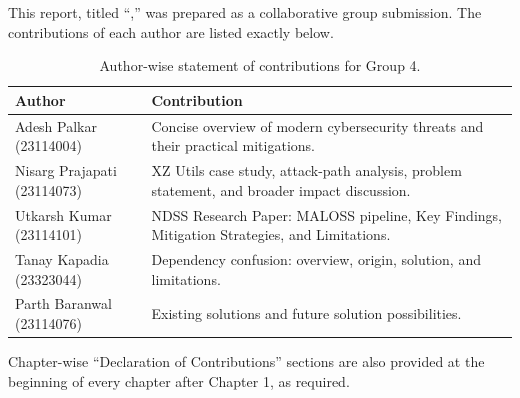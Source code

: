 This report, titled ``\ttitle,'' was prepared as a collaborative group submission.
The contributions of each author are listed exactly below.

\begin{table}[h]
\centering
\renewcommand{\arraystretch}{1.2}
\begin{tabular}{p{} p{}}
\toprule
\textbf{Author} & \textbf{Contribution} \\
\midrule
Adesh Palkar (23114004) & Concise overview of modern cybersecurity threats and their practical mitigations. \\
Nisarg Prajapati (23114073) & XZ Utils case study, attack-path analysis, problem statement, and broader impact discussion. \\
Utkarsh Kumar (23114101) & NDSS Research Paper: MALOSS pipeline, Key Findings, Mitigation Strategies, and Limitations. \\
Tanay Kapadia (23323044) & Dependency confusion: overview, origin, solution, and limitations. \\
Parth Baranwal (23114076) & Existing solutions and future solution possibilities. \\
\bottomrule
\end{tabular}
\caption{Author-wise statement of contributions for Group 4.}
\label{tab:statement-contributions}
\end{table}

Chapter-wise ``Declaration of Contributions'' sections are also provided at the beginning of every chapter after Chapter 1, as required.

\clearpage

